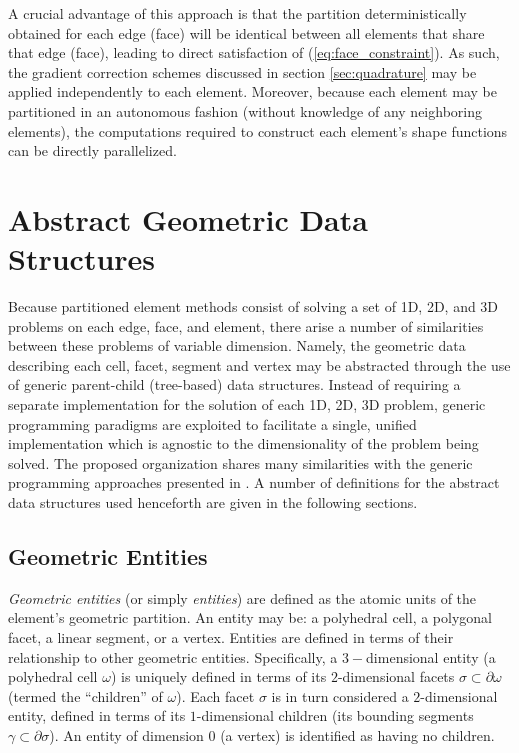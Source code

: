 	A crucial advantage of this approach is that the partition deterministically obtained for each edge (face) will be identical between all elements that share that edge (face), leading to direct satisfaction of (\ref{eq:face_constraint}). As such, the gradient correction schemes discussed in section \ref{sec:quadrature} may be applied independently to each element. Moreover, because each element may be partitioned in an autonomous fashion (without knowledge of any neighboring elements), the computations required to construct each element's shape functions can be directly parallelized.

\section{Abstract Geometric Data Structures}

	Because partitioned element methods consist of solving a set of 1D, 2D, and 3D problems on each edge, face, and element, there arise a number of similarities between these problems of variable dimension. Namely, the geometric data describing each cell, facet, segment and vertex may be abstracted through the use of generic parent-child (tree-based) data structures. Instead of requiring a separate implementation for the solution of each 1D, 2D, 3D problem, generic programming paradigms are exploited to facilitate a single, unified implementation which is agnostic to the dimensionality of the problem being solved. The proposed organization shares many similarities with the generic programming approaches presented in \cite{Cicuttin:17}. A number of definitions for the abstract data structures used henceforth are given in the following sections.
	
\subsection*{Geometric Entities}

	\textit{Geometric entities} (or simply \textit{entities}) are defined as the atomic units of the element's geometric partition. An entity may be: a polyhedral cell, a polygonal facet, a linear segment, or a vertex. Entities are defined in terms of their relationship to other geometric entities. Specifically, a $3-$dimensional entity (a polyhedral cell $\omega$) is uniquely defined in terms of its $2$-dimensional facets $\sigma \subset \partial \omega$ (termed the ``children'' of $\omega$). Each facet $\sigma$ is in turn considered a $2$-dimensional entity, defined in terms of its $1$-dimensional children (its bounding segments $\gamma \subset \partial \sigma$). An entity of dimension $0$ (a vertex) is identified as having no children.
	
